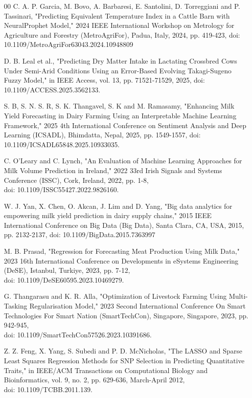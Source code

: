 \documentclass[conference]{IEEEtran}
\begin{document}
	
	\begin{thebibliography}{00}
	C. A. P. Garcia, M. Bovo, A. Barbaresi, E. Santolini, D. Torreggiani and P. Tassinari, "Predicting Equivalent Temperature Index in a Cattle Barn with NeuralProphet Model," 2024 IEEE International Workshop on Metrology for Agriculture and Forestry (MetroAgriFor), Padua, Italy, 2024, pp. 419-423, doi: 10.1109/MetroAgriFor63043.2024.10948809
	
	D. B. Leal et al., "Predicting Dry Matter Intake in Lactating Crossbred Cows Under Semi-Arid Conditions Using an Error-Based Evolving Takagi-Sugeno Fuzzy Model," in IEEE Access, vol. 13, pp. 71521-71529, 2025, doi: 10.1109/ACCESS.2025.3562133. 
	
	S. B, S. N. S. R, S. K. Thangavel, S. K and M. Ramasamy, "Enhancing Milk Yield Forecasting in Dairy Farming Using an Interpretable Machine Learning Framework," 2025 4th International Conference on Sentiment Analysis and Deep Learning (ICSADL), Bhimdatta, Nepal, 2025, pp. 1549-1557, doi: 10.1109/ICSADL65848.2025.10933035.
	
	C. O'Leary and C. Lynch, "An Evaluation of Machine Learning Approaches for Milk Volume Prediction in Ireland," 2022 33rd Irish Signals and Systems Conference (ISSC), Cork, Ireland, 2022, pp. 1-8,\\
	doi: 10.1109/ISSC55427.2022.9826160.
	
	W. J. Yan, X. Chen, O. Akcan, J. Lim and D. Yang, "Big data analytics for empowering milk yield prediction in dairy supply chains," 2015 IEEE International Conference on Big Data (Big Data), Santa Clara, CA, USA, 2015, pp. 2132-2137, doi: 10.1109/BigData.2015.7363997
	
	M. B. Prasad, "Regression for Forecasting Meat Production Using Milk Data," 2023 16th International Conference on Developments in eSystems Engineering (DeSE), Istanbul, Turkiye, 2023, pp. 7-12,\\
	doi: 10.1109/DeSE60595.2023.10469279.
	
	G. Thangarasu and K. R. Alla, "Optimization of Livestock Farming Using Multi-Tasking Regularisation Model," 2023 Second International Conference On Smart Technologies For Smart Nation (SmartTechCon), Singapore, Singapore, 2023, pp. 942-945,\\ 
	doi: 10.1109/SmartTechCon57526.2023.10391686.
	
	Z. Z. Feng, X. Yang, S. Subedi and P. D. McNicholas, "The LASSO and Sparse Least Squares Regression Methods for SNP Selection in Predicting Quantitative Traits," in IEEE/ACM Transactions on Computational Biology and Bioinformatics, vol. 9, no. 2, pp. 629-636, March-April 2012,\\ doi: 10.1109/TCBB.2011.139.
	

\end{thebibliography}
\end{document}
